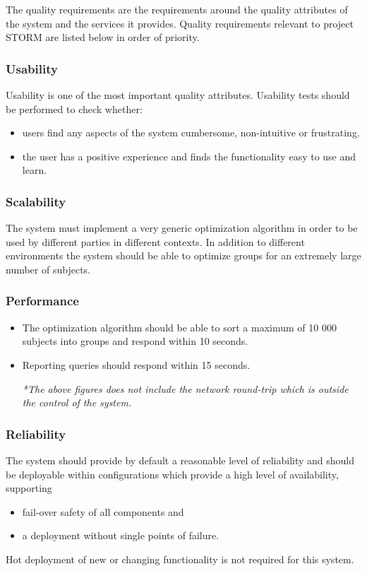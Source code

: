 The quality requirements are the requirements around the quality attributes of the system and
the services it provides. Quality requirements relevant to project STORM are listed below in order of priority. \par

\subsubsection{Usability}
Usability is one of the most important quality attributes. Usability tests should be performed to check whether:
\begin{itemize}
\item users find any aspects of the system cumbersome, non-intuitive or frustrating.
\item the user has a positive experience and finds the functionality easy to use and learn.
\end{itemize}

\subsubsection{Scalability}
The system must implement a very generic optimization algorithm in order to be used by different parties in different contexts. In addition to different environments the system should be able to optimize groups for an extremely large number of subjects.

\subsubsection{Performance}
\begin{itemize}
\item The optimization algorithm should be able to sort a maximum of 10 000 subjects into groups and respond within 10 seconds.
\item Reporting queries should respond within 15 seconds. \par
\textit {*The above figures does not include the network round-trip which is outside the control of the system.}
\end{itemize}

\subsubsection{Reliability}
The system should provide by default a reasonable level of reliability and should be deployable within configurations which provide a high level of availability, supporting
\begin{itemize}
\item fail-over safety of all components and
\item a deployment without single points of failure.
\end{itemize}
Hot deployment of new or changing functionality is not required for this system.


